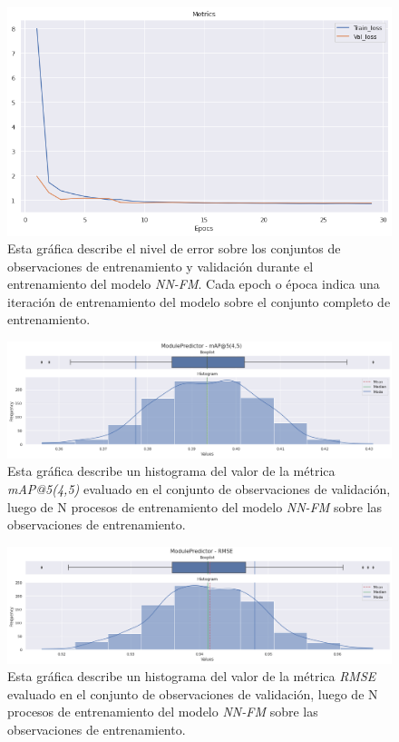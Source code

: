 \documentclass[11pt,a4paper,twoside]{thesis}
\begin{document}
{\begin{figure}[h!]
	\centering
	\includegraphics[width=13cm]{./images/metrics-NN-FM-train-val-loss.png}
	\caption{Esta gráfica describe el nivel de error sobre los conjuntos de observaciones de entrenamiento y validación durante el entrenamiento del modelo \textit{NN-FM}. Cada epoch o época indica una iteración de entrenamiento del modelo sobre el conjunto completo de entrenamiento.}
\end{figure}


\clearpage

\begin{figure}[h!]
	\centering
	\includegraphics[width=15cm]{./images/metrics-NN-FM-mapk.png}
	\caption{Esta gráfica describe un histograma del valor de la métrica \textit{mAP@5(4,5)} evaluado en el conjunto de observaciones de validación, luego de N procesos de entrenamiento del modelo \textit{NN-FM} sobre las observaciones de entrenamiento.}
\end{figure}

\begin{figure}[h!]
	\centering
	\includegraphics[width=15cm]{./images/metrics-NN-FM-RMSE.png}
	\caption{Esta gráfica describe un histograma del valor de la métrica \textit{RMSE} evaluado en el conjunto de observaciones de validación, luego de N procesos de entrenamiento del modelo \textit{NN-FM} sobre las observaciones de entrenamiento.}
\end{figure}




}
\end{document}
